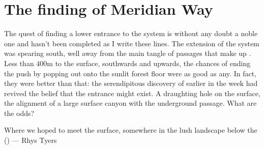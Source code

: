 \section{The finding of Meridian Way}
\begin{marginfigure}
\end{marginfigure}

The quest of finding a lower entrance to the system is without any doubt a noble one and hasn't been completed as I write these lines. The  extension of the system was spearing south, well away from the main tangle of passages that make up . Less than 400m to the surface, southwards and upwards, the chances of ending the push by popping out onto the sunlit forest floor were as good as any. In fact, they were better than that: the serendipitous discovery of  earlier in the week had revived the belief that the entrance might exist. A draughting hole on the surface, the alignment of a large surface canyon with the underground passage. What are the odds?

\begin{pagefigure}
\checkoddpage \ifoddpage \forcerectofloat \else \forceversofloat \fi
\centering
{}
\caption{Where we hoped to meet the surface, somewhere in the lush landscape below the \protect{} (\protect{}) --- Rhys Tyers}
\label{planina na kalu}
\end{pagefigure}

